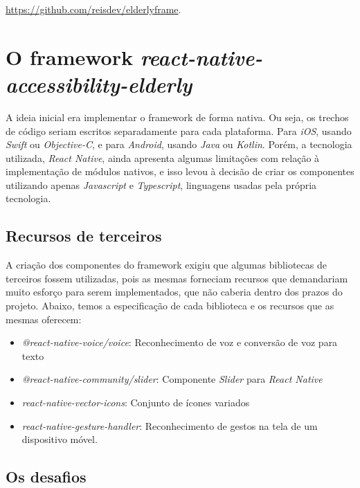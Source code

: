 \documentclass[
	12pt,				    %
	openright,			    %
	oneside,			    %
	a4paper,			    %
    sumario=tradicional,    %
	english,			    %
	brazil,				    %
	]{abntex2}              %
\begin{document}
\href{https://github.com/reisdev/elderlyframe/}{https://github.com/reisdev/elderlyframe}.


\section{O framework \textit{react-native-accessibility-elderly}}

\par

A ideia inicial era implementar o framework de forma nativa. Ou seja, os trechos de código seriam escritos separadamente para cada plataforma. Para \textit{iOS}, usando \textit{Swift} ou \textit{Objective-C}, e para \textit{Android}, usando \textit{Java} ou \textit{Kotlin}. Porém, a tecnologia utilizada, \textit{React Native}, ainda apresenta algumas limitações com relação à implementação de módulos nativos, e isso levou à decisão de criar os componentes utilizando apenas \textit{Javascript} e \textit{Typescript}, linguagens usadas pela própria tecnologia.

\subsection{Recursos de terceiros}

A criação dos componentes do framework exigiu que algumas bibliotecas de terceiros fossem utilizadas, pois as mesmas forneciam recursos que demandariam muito esforço para serem implementados, que não caberia dentro dos prazos do projeto. Abaixo, temos a especificação de cada biblioteca e os recursos que as mesmas oferecem:

\begin{itemize}
	\item \textit{@react-native-voice/voice}: Reconhecimento de voz e conversão de voz para texto
	\item \textit{@react-native-community/slider}: Componente \textit{Slider} para \textit{React Native}
	\item \textit{react-native-vector-icons}: Conjunto de ícones variados
	\item \textit{react-native-gesture-handler}: Reconhecimento de gestos na tela de um dispositivo móvel.
\end{itemize}

\subsection{Os desafios}
\end{document}
